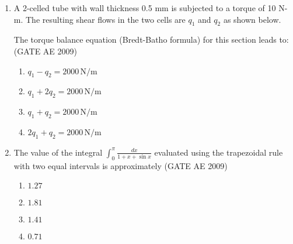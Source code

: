 \documentclass[journal]{IEEEtran}
\begin{document}
\begin{enumerate}
    
    \item A 2-celled tube with wall thickness 0.5 mm is subjected to a torque of 10 N-m. The resulting shear flows in the two cells are \( q_1 \) and \( q_2 \) as shown below. 
    
    
   \begin{center}
   \end{center}
    
    \noindent The torque balance equation (Bredt-Batho formula) for this section leads to:  \hfill (GATE AE 2009)
    \begin{multicols}{2}
        \begin{enumerate}
            \item \( q_1 - q_2 = 2000 \, \text{N/m} \)
            \item \( q_1 + 2q_2 = 2000 \, \text{N/m} \)
            \item \( q_1 + q_2 = 2000 \, \text{N/m} \)
            \item \( 2q_1 + q_2 = 2000 \, \text{N/m} \)
        \end{enumerate}
    \end{multicols}
        

    \item The value of the integral $\int_0^\pi \frac{dx}{1+x+\sin x}$ evaluated using the trapezoidal rule with two equal intervals is approximately  \hfill (GATE AE 2009)
    \begin{multicols}{4}
        \begin{enumerate}
            \item $1.27$
            \item $1.81$
            \item $1.41$
            \item $0.71$
        \end{enumerate}
    \end{multicols}


\end{enumerate}
\end{document}
